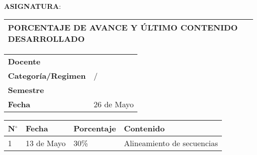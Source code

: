 \clearpage


\vspace{1cm}
{\centering 
	\MakeUppercase{\textbf{Asignatura}}: \MakeUppercase{\cscourse}} \\
\vspace{0.5cm}

\begin{table}[H]
	\centering
	\begin{tabular}{|x{\textwidth}|}
		\hline 
		 \textbf{PORCENTAJE DE AVANCE Y ÚLTIMO CONTENIDO DESARROLLADO} \\ \hline
	\end{tabular}
\end{table}

\begin{table}[H]
	\centering
	\begin{tabular}{|p{}|p{}|}
		\hline 
		\textbf{Docente} & \csauthor \\ \arrayrulecolor{black}\hline
		\textbf{Categoría/Regimen} & \cscategoria / \csregimen \\ \hline
		\textbf{Semestre} & \cssemestre \\ \hline
		\textbf{Fecha} & 26 de Mayo \\ \hline
	\end{tabular}
\end{table}

\begin{table}[H]
	\centering
	\begin{tabular}{|p{0.4cm}|p{2.5cm}|p{2.6cm}|p{8.3cm}|}
		\hline 
		\textbf{N$^{\circ}$} & \textbf{Fecha} & \textbf{Porcentaje} & \textbf{Contenido} \\ \hline
		1 & 13 de Mayo & 30\% & Alineamiento de secuencias \\ \hline
	\end{tabular}
\end{table}

